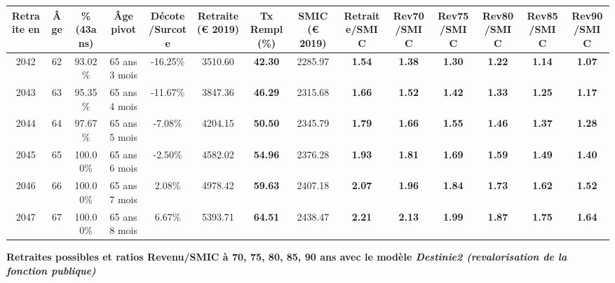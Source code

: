 \begin{adjustbox}{max width=\textwidth} 
\begin{tabular}[htb]{|c|c||c|c|c||c|c||c||c|c|c|c|c|c|} 
\hline 
 Retraite en &  Âge &  \%(43ans) &  Âge pivot &  Décote/Surcote &  Retraite (\euro{} 2019) &  Tx Rempl(\%) &  SMIC (\euro{} 2019) &  Retraite/SMIC &  Rev70/SMIC &  Rev75/SMIC &  Rev80/SMIC &  Rev85/SMIC &  Rev90/SMIC \\ 
\hline \hline 
 2042 &  62 &  93.02\% &  65 ans 3 mois &  -16.25\% &  3510.60 &  {\bf 42.30} &  2285.97 &  {\bf 1.54} &  {\bf 1.38} &  {\bf 1.30} &  {\bf 1.22} &  {\bf 1.14} &  {\bf 1.07} \\ 
\hline 
 2043 &  63 &  95.35\% &  65 ans 4 mois &  -11.67\% &  3847.36 &  {\bf 46.29} &  2315.68 &  {\bf 1.66} &  {\bf 1.52} &  {\bf 1.42} &  {\bf 1.33} &  {\bf 1.25} &  {\bf 1.17} \\ 
\hline 
 2044 &  64 &  97.67\% &  65 ans 5 mois &  -7.08\% &  4204.15 &  {\bf 50.50} &  2345.79 &  {\bf 1.79} &  {\bf 1.66} &  {\bf 1.55} &  {\bf 1.46} &  {\bf 1.37} &  {\bf 1.28} \\ 
\hline 
 2045 &  65 &  100.00\% &  65 ans 6 mois &  -2.50\% &  4582.02 &  {\bf 54.96} &  2376.28 &  {\bf 1.93} &  {\bf 1.81} &  {\bf 1.69} &  {\bf 1.59} &  {\bf 1.49} &  {\bf 1.40} \\ 
\hline 
 2046 &  66 &  100.00\% &  65 ans 7 mois &  2.08\% &  4978.42 &  {\bf 59.63} &  2407.18 &  {\bf 2.07} &  {\bf 1.96} &  {\bf 1.84} &  {\bf 1.73} &  {\bf 1.62} &  {\bf 1.52} \\ 
\hline 
 2047 &  67 &  100.00\% &  65 ans 8 mois &  6.67\% &  5393.71 &  {\bf 64.51} &  2438.47 &  {\bf 2.21} &  {\bf 2.13} &  {\bf 1.99} &  {\bf 1.87} &  {\bf 1.75} &  {\bf 1.64} \\ 
\hline 
\hline 
\end{tabular} 
\end{adjustbox} 
 
 \vspace{0.1cm} 
{\bf \noindent Retraites possibles et ratios Revenu/SMIC à 70, 75, 80, 85, 90 ans avec le modèle \emph{Destinie2 (revalorisation de la fonction publique)}}  
 
